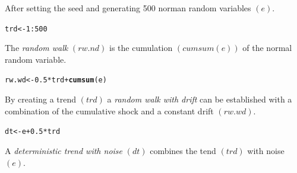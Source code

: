 \documentclass{article}\usepackage{graphicx, color}
\makeatletter
\newcommand{\hlfunctioncall}[1]{\textcolor[rgb]{0.501960784313725,0,0.329411764705882}{\textbf{#1}}}%
\newenvironment{kframe}{%
 \def\at@end@of@kframe{}%
 \ifinner\ifhmode%
  \def\at@end@of@kframe{\end{minipage}}%
  \begin{minipage}{\columnwidth}%
 \fi\fi%
 \def\FrameCommand##1{\hskip\@totalleftmargin \hskip-\fboxsep
 \colorbox{shadecolor}{##1}\hskip-\fboxsep
     \hskip-\linewidth \hskip-\@totalleftmargin \hskip\columnwidth}%
 \MakeFramed {\advance\hsize-\width
   \@totalleftmargin\z@ \linewidth\hsize
   \@setminipage}}%
 {\par\unskip\endMakeFramed%
 \at@end@of@kframe}
\newenvironment{knitrout}{}{} %
\makeatother
\begin{document}
After setting the seed and generating 500 norman random variables $(e)$. 
\begin{knitrout}
\color{fgcolor}\begin{kframe}
\begin{alltt}
trd <- 1:500
\end{alltt}
\end{kframe}
\end{knitrout}

The \emph{random walk} $(rw.nd)$ is the cumulation $(cumsum(e))$ of the normal random variable.
\begin{knitrout}
\color{fgcolor}\begin{kframe}
\begin{alltt}
rw.wd <- 0.5 * trd + \hlfunctioncall{cumsum}(e)
\end{alltt}
\end{kframe}
\end{knitrout}

By creating a trend $(trd)$ a \emph{random walk with drift} can be established with a combination of the cumulative shock and a constant drift $(rw.wd)$.
\begin{knitrout}
\color{fgcolor}\begin{kframe}
\begin{alltt}
dt <- e + 0.5 * trd
\end{alltt}
\end{kframe}
\end{knitrout}

A \emph{deterministic trend with noise} $(dt)$ combines the tend $(trd)$ with noise $(e)$.
\end{document}
